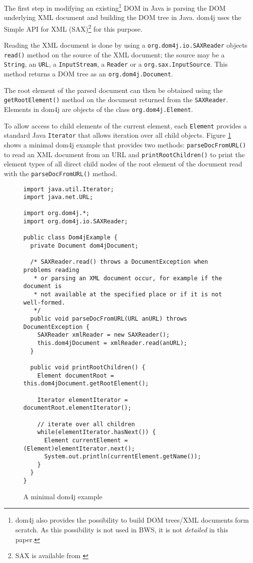 The first step in modifying an existing\footnote{dom4j also provides the possibility to build DOM trees/XML documents form scratch. As this possibility is not used in BWS, it is not \emph{detailed} in this paper.}  DOM in Java is parsing the DOM underlying XML document and building the DOM tree in Java. dom4j uses the Simple API for XML (SAX)\footnote{SAX is available from \cite{SaxHP}} for this purpose.


Reading the XML document is done by using a \texttt{org.dom4j.io.SAXReader} objects \texttt{read()} method on the source of the XML document; the source may be a \texttt{String}, an \texttt{URL}, a \texttt{InputStream}, a \texttt{Reader} or a \texttt{org.sax.InputSource}. This method returns a DOM tree as an \texttt{org.dom4j.Document}.

The root element of the parsed document can then be obtained using the \texttt{getRootElement()} method on the document returned from the \texttt{SAXReader}. Elements in dom4j are objects of the class \texttt{org.dom4j.Element}.

To allow access to child elements of the current element, each \texttt{Element} provides a standard Java \texttt{Iterator} that allows iteration over all child objects. Figure \ref{fig:AMinimalDom4jExample} shows a minimal dom4j example that provides two methods: \texttt{parseDocFromURL()} to read an XML document from an URL and \texttt{printRootChildren()} to print the element types of all direct child nodes of the root element of the document read with the \texttt{parseDocFromURL()} method.

\begin{figure}[htb]
  \begin{verbatim}
import java.util.Iterator;
import java.net.URL;

import org.dom4j.*;
import org.dom4j.io.SAXReader;

public class Dom4jExample {
  private Document dom4jDocument;
  
  /* SAXReader.read() throws a DocumentException when problems reading
   * or parsing an XML document occur, for example if the document is
   * not available at the specified place or if it is not well-formed.
   */
  public void parseDocFromURL(URL anURL) throws DocumentException {
    SAXReader xmlReader = new SAXReader();
    this.dom4jDocument = xmlReader.read(anURL);
  }
  
  public void printRootChildren() {
    Element documentRoot = this.dom4jDocument.getRootElement();
    
    Iterator elementIterator = documentRoot.elementIterator();
    
    // iterate over all children
    while(elementIterator.hasNext()) {
      Element currentElement = (Element)elementIterator.next();
      System.out.println(currentElement.getName());
    }
  }
}
  \end{verbatim}
	
	\caption{A minimal dom4j example}
	\label{fig:AMinimalDom4jExample}
\end{figure}